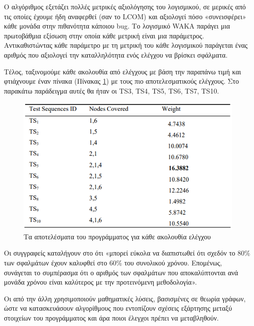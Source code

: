 \documentclass[12pt]{article}
\begin{document}
\par Ο αλγόριθμος εξετάζει πολλές μετρικές αξιολόγησης του λογισμικού, σε μερικές από τις οποίες έχουμε ήδη αναφερθεί (σαν το LCOM) και αξιολογεί πόσο «συνεισφέρει» κάθε μονάδα στην πιθανότητα κάποιου bug. Το λογισμικό WAKA παράγει μια πρωτοβάθμια εξίσωση στην οποία κάθε μετρική είναι μια παράμετρος. Αντικαθιστώντας κάθε παράμετρο με τη μετρική του κάθε λογισμικού παράγεται ένας αριθμός που αξιολογεί την καταλληλότητα ενός ελέγχου να βρίσκει σφάλματα. 

\par Τέλος, ταξινομούμε κάθε ακολουθία από ελέγχους με βάση την παραπάνω τιμή και φτιάχνουμε έναν πίνακα (Πίνακας \ref{fig:test_table}) με τους πιο αποτελεσματικούς ελέγχους. Στο παρακάτω παράδειγμα αυτές θα ήταν οι TS3, TS4, TS5, TS6, TS7, TS10.

\begin{figure}
\label{fig:test_table}
\caption{Τα αποτελέσματα του προγράμματος για κάθε ακολουθία ελέγχου}
\includegraphics[width=\textwidth,height=\textheight,keepaspectratio]{test_table.PNG}
\end{figure}
 
\par Οι συγγραφείς καταλήγουν στο ότι «μπορεί εύκολα να διαπιστωθεί ότι σχεδόν το 80\% των σφαλμάτων έχουν καλυφθεί στο 60\% του συνολικού χρόνου. Επομένως, συνάγεται το συμπέρασμα ότι ο αριθμός των σφαλμάτων που αποκαλύπτονται ανά μονάδα χρόνου είναι καλύτερος με την προτεινόμενη μεθοδολογία».

\par Οι \textcite{kung} από την άλλη χρησιμοποιούν μαθηματικές λύσεις, βασισμένες σε θεωρία γράφων, ώστε να κατασκευάσουν αλγορίθμους που εντοπίζουν σχέσεις εξάρτησης μεταξύ στοιχείων του προγράμματος και άρα ποιοι έλεγχοι πρέπει να μεταβληθούν.
\end{document}
